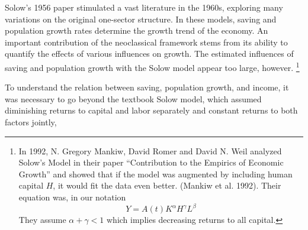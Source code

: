 

Solow's 1956 paper stimulated a vast literature in the 1960s, exploring many variations on the original one-sector structure. %
In these models, saving and population growth rates determine the growth trend of the economy. An important  contribution of the neoclassical framework stems from its ability to quantify the effects of various influences on growth. The estimated influences of saving and population growth with the Solow model appear too large, however.%
\footnote{In 1992, N. Gregory Mankiw, David Romer %
and David N. Weil analyzed Solow’s Model in their paper “Contribution to the Empirics of Economic Growth” and  showed that %
if the model was augmented by including human capital $H$, it would fit the data even better.   (Mankiw et al. 1992). Their equation was, in our notation   \[Y=A(t)K^\alpha H^\gamma L^\beta\label{Eq:Mankiw}\] They assume $\alpha+\gamma<1$ which implies decreasing returns to all capital.}

To understand the relation between saving, population growth, and income, it was necessary to go beyond the textbook Solow model, which assumed  diminishing returns to capital and labor separately and constant returns to both factors jointly,


